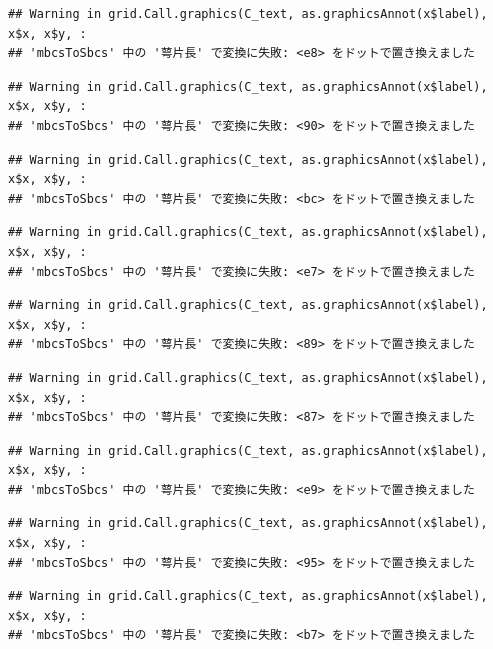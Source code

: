 \documentclass[
]{book}
\begin{document}
\begin{verbatim}
## Warning in grid.Call.graphics(C_text, as.graphicsAnnot(x$label), x$x, x$y, :
## 'mbcsToSbcs' 中の '萼片長' で変換に失敗: <e8> をドットで置き換えました
\end{verbatim}

\begin{verbatim}
## Warning in grid.Call.graphics(C_text, as.graphicsAnnot(x$label), x$x, x$y, :
## 'mbcsToSbcs' 中の '萼片長' で変換に失敗: <90> をドットで置き換えました
\end{verbatim}

\begin{verbatim}
## Warning in grid.Call.graphics(C_text, as.graphicsAnnot(x$label), x$x, x$y, :
## 'mbcsToSbcs' 中の '萼片長' で変換に失敗: <bc> をドットで置き換えました
\end{verbatim}

\begin{verbatim}
## Warning in grid.Call.graphics(C_text, as.graphicsAnnot(x$label), x$x, x$y, :
## 'mbcsToSbcs' 中の '萼片長' で変換に失敗: <e7> をドットで置き換えました
\end{verbatim}

\begin{verbatim}
## Warning in grid.Call.graphics(C_text, as.graphicsAnnot(x$label), x$x, x$y, :
## 'mbcsToSbcs' 中の '萼片長' で変換に失敗: <89> をドットで置き換えました
\end{verbatim}

\begin{verbatim}
## Warning in grid.Call.graphics(C_text, as.graphicsAnnot(x$label), x$x, x$y, :
## 'mbcsToSbcs' 中の '萼片長' で変換に失敗: <87> をドットで置き換えました
\end{verbatim}

\begin{verbatim}
## Warning in grid.Call.graphics(C_text, as.graphicsAnnot(x$label), x$x, x$y, :
## 'mbcsToSbcs' 中の '萼片長' で変換に失敗: <e9> をドットで置き換えました
\end{verbatim}

\begin{verbatim}
## Warning in grid.Call.graphics(C_text, as.graphicsAnnot(x$label), x$x, x$y, :
## 'mbcsToSbcs' 中の '萼片長' で変換に失敗: <95> をドットで置き換えました
\end{verbatim}

\begin{verbatim}
## Warning in grid.Call.graphics(C_text, as.graphicsAnnot(x$label), x$x, x$y, :
## 'mbcsToSbcs' 中の '萼片長' で変換に失敗: <b7> をドットで置き換えました
\end{verbatim}
\end{document}
